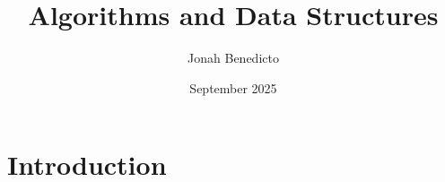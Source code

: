 \documentclass{book}
\title{Algorithms and Data Structures}
\author{Jonah Benedicto}
\date{September 2025}
\begin{document}
\maketitle

\section*{Introduction}

\tableofcontents








\end{document}
